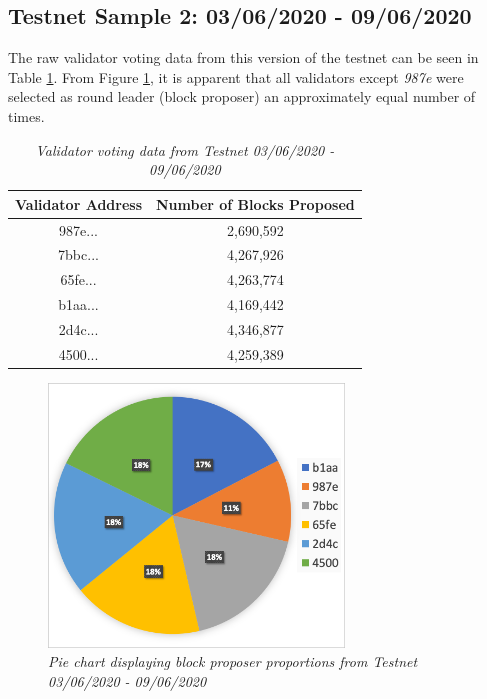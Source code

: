 \documentclass[12pt,openany,a4paper]{book}
\begin{document}
\subsection{Testnet Sample 2: 03/06/2020 - 09/06/2020}
The raw validator voting data from this version of the testnet can be seen in Table 
\ref{validator_table_2}. From Figure \ref{validator_pie_2}, it is apparent that all 
validators except \textit{987e} were selected as round leader (block proposer) an 
approximately equal number of times.
\begin{table}[h!]
    \caption{\sl Validator voting data from Testnet 03/06/2020 - 09/06/2020}
    \label{validator_table_2}
\begin{center}
\begin{tabular}{ |c|c| } 
    \hline
    Validator Address & Number of Blocks Proposed \\
    \hline
    \hline
    987e... & 2,690,592 \\
    \hline
    7bbc... & 4,267,926 \\
    \hline
    65fe... & 4,263,774 \\
    \hline
    b1aa... & 4,169,442 \\
    \hline
    2d4c... & 4,346,877 \\
    \hline
    4500... & 4,259,389 \\
    \hline
\end{tabular}
\end{center}
\end{table}

\begin{figure}[h]
    \caption{\sl Pie chart displaying block proposer proportions from Testnet 03/06/2020 - 09/06/2020}
    \label{validator_pie_2}
    \begin{center}
    \includegraphics[width=0.7\textwidth]{imgs/testnet_validator_pie_2.png}
    \end{center}
\end{figure}
\end{document}
